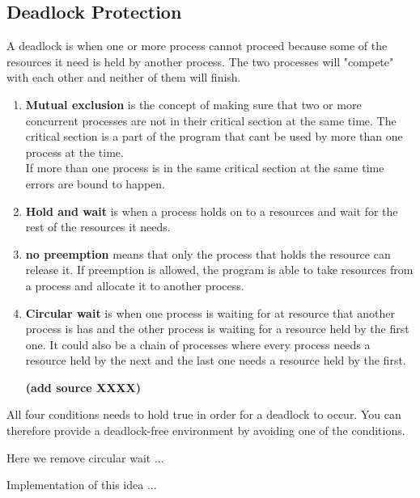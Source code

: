 \subsection{Deadlock Protection}
\label{sec:DeadlockProtection}

A deadlock is when one or more process cannot proceed because some of the resources it need is held by another process. The two processes will "compete" with each other and neither of them will finish.
 
\begin{enumerate}[noitemsep]
	
	\item \textbf{Mutual exclusion} is the concept of making sure that two or more concurrent processes are not in their critical section at the same time. The critical section is a part of the program that cant be used by more than one process at the time.\\ If more than one process is in the same critical section at the same time errors are bound to happen.
	
	\item \textbf{Hold and wait} is when a process holds on to a resources and wait for the rest of the resources it needs.%
	
	\item \textbf{no preemption} means that only the process that holds the resource can release it. If preemption is allowed, the program is able to take resources from a process and allocate it to another process.
	
	\item \textbf{Circular wait} is when one process is waiting for at resource that another process is has and the other process is waiting for a resource held by the first one. It could also be a chain of processes where every process needs a resource held by the next and the last one needs a resource held by the first.
	
\textbf{(add source XXXX)}
	
\end{enumerate}

All four conditions needs to hold true in order for a deadlock to occur. You can therefore provide a deadlock-free environment by avoiding one of the conditions. 

Here we remove circular wait ...

Implementation of this idea ...